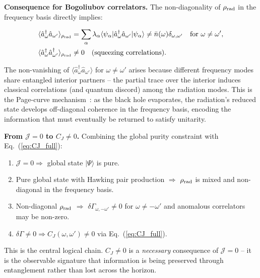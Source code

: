 \documentclass[prd,aps,showpacs,superscriptaddress,twocolumn]{revtex4-2}
\begin{document}
\textbf{Consequence for Bogoliubov correlators.} The non-diagonality of $\rho_{\rm rad}$ in the frequency basis directly implies:

\begin{align}
\langle \hat{a}_\omega^\dagger \hat{a}_{\omega'} \rangle_{\rho_{\rm rad}} &= \sum_\alpha \lambda_\alpha \langle \psi_\alpha | \hat{a}_\omega^\dagger \hat{a}_{\omega'} |\psi_\alpha\rangle \neq \bar{n}(\omega) \delta_{\omega,\omega'} \quad \text{for } \omega \neq \omega', \label{eq:nondiag_a}\\
\langle \hat{a}_\omega^\dagger \hat{a}_{\omega'}^\dagger \rangle_{\rho_{\rm rad}} &\neq 0 \quad \text{(squeezing correlations)}. \label{eq:anom_a}
\end{align}

The non-vanishing of $\langle \hat{a}_\omega^\dagger \hat{a}_{\omega'} \rangle$ for $\omega \neq \omega'$ arises because different frequency modes share entangled interior partners -- the partial trace over the interior induces classical correlations (and quantum discord) among the radiation modes. This is the Page-curve mechanism~\cite{Page1993}: as the black hole evaporates, the radiation's reduced state develops off-diagonal coherence in the frequency basis, encoding the information that must eventually be returned to satisfy unitarity.

\textbf{From $\mathcal{J}=0$ to $C_J \neq 0$.} Combining the global purity constraint with Eq.~(\ref{eq:CJ_full}):

\begin{enumerate}
    \item $\mathcal{J}=0 \Rightarrow$ global state $|\Psi\rangle$ is pure.
    \item Pure global state with Hawking pair production $\Rightarrow$ $\rho_{\rm rad}$ is mixed and non-diagonal in the frequency basis.
    \item Non-diagonal $\rho_{\rm rad}$ $\Rightarrow$ $\delta\Gamma_{\omega,-\omega'} \neq 0$ for $\omega \neq -\omega'$ and anomalous correlators may be non-zero.
    \item $\delta\Gamma \neq 0 \Rightarrow C_J(\omega,\omega') \neq 0$ via Eq.~(\ref{eq:CJ_full}).
\end{enumerate}

This is the central logical chain. $C_J \neq 0$ is a \emph{necessary} consequence of $\mathcal{J}=0$ -- it is the observable signature that information is being preserved through entanglement rather than lost across the horizon.
\end{document}
